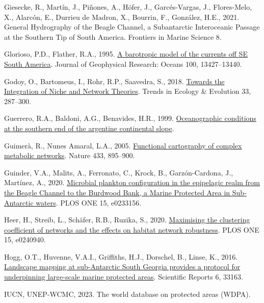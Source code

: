 \documentclass[
]{article}
\newlength{\cslhangindent}
\newenvironment{CSLReferences}[2] %
 {\begin{list}{}{%
  \setlength{\itemindent}{0pt}
  \setlength{\leftmargin}{0pt}
  \setlength{\parsep}{0pt}
  \ifodd #1
   \setlength{\leftmargin}{\cslhangindent}
   \setlength{\itemindent}{-1\cslhangindent}
  \fi
  \setlength{\itemsep}{#2\baselineskip}}}
 {\end{list}}
\begin{document}
\begin{CSLReferences}{1}{0}
Giesecke, R., Martín, J., Piñones, A., Höfer, J., Garcés-Vargas, J.,
Flores-Melo, X., Alarcón, E., Durrieu de Madron, X., Bourrin, F.,
González, H.E., 2021. General {Hydrography} of the {Beagle Channel}, a
{Subantarctic Interoceanic Passage} at the {Southern Tip} of {South
America}. Frontiers in Marine Science 8.

Glorioso, P.D., Flather, R.A., 1995.
\href{https://doi.org/10.1029/95JC00942}{A barotropic model of the
currents off {SE South America}}. Journal of Geophysical Research:
Oceans 100, 13427--13440.

Godoy, O., Bartomeus, I., Rohr, R.P., Saavedra, S., 2018.
\href{https://doi.org/10.1016/j.tree.2018.01.007}{Towards the
{Integration} of {Niche} and {Network Theories}}. Trends in Ecology \&
Evolution 33, 287--300.

Guerrero, R.A., Baldoni, A.G., Benavides, H.R., 1999.
\href{http://10.0.64.26/handle/inidep/247}{Oceanographic conditions at
the southern end of the argentine continental slope}.

Guimerà, R., Nunes Amaral, L.A., 2005.
\href{https://doi.org/10.1038/nature03288}{Functional cartography of
complex metabolic networks}. Nature 433, 895--900.

Guinder, V.A., Malits, A., Ferronato, C., Krock, B., Garzón-Cardona, J.,
Martínez, A., 2020.
\href{https://doi.org/10.1371/journal.pone.0233156}{Microbial plankton
configuration in the epipelagic realm from the {Beagle Channel} to the
{Burdwood Bank}, a {Marine Protected Area} in {Sub-Antarctic} waters}.
PLOS ONE 15, e0233156.

Heer, H., Streib, L., Schäfer, R.B., Ruzika, S., 2020.
\href{https://doi.org/10.1371/journal.pone.0240940}{Maximising the
clustering coefficient of networks and the effects on habitat network
robustness}. PLOS ONE 15, e0240940.

Hogg, O.T., Huvenne, V.A.I., Griffiths, H.J., Dorschel, B., Linse, K.,
2016. \href{https://doi.org/10.1038/srep33163}{Landscape mapping at
sub-{Antarctic South Georgia} provides a protocol for underpinning
large-scale marine protected areas}. Scientific Reports 6, 33163.

IUCN, UNEP-WCMC, 2023. The world database on protected areas ({WDPA}).


\end{CSLReferences}
\end{document}
